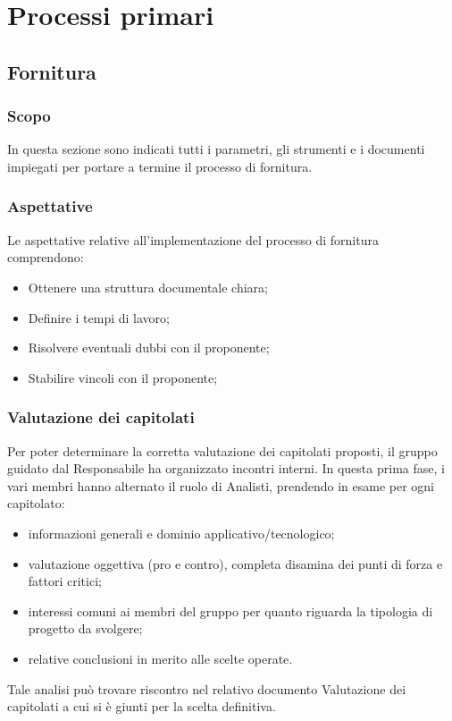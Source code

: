 \documentclass{article}
\begin{document}
\section{Processi primari}

\subsection{Fornitura}

\subsubsection{Scopo}
In questa sezione sono indicati tutti i parametri, gli strumenti e i documenti impiegati per portare a termine il processo di fornitura.

\subsubsection{Aspettative}
Le aspettative relative all'implementazione del processo di fornitura comprendono:
\begin{itemize}
    \item Ottenere una struttura documentale chiara;
    \item Definire i tempi di lavoro;
    \item Risolvere eventuali dubbi con il proponente;
    \item Stabilire vincoli con il proponente;
\end{itemize}

\subsubsection{Valutazione dei capitolati}
Per poter determinare la corretta valutazione dei capitolati proposti, il gruppo guidato dal Responsabile ha organizzato incontri interni. In questa prima fase, i vari membri hanno alternato il ruolo di Analisti, prendendo in esame per ogni capitolato:
\begin{itemize}
    \item informazioni generali e dominio applicativo/tecnologico;
    \item valutazione oggettiva (pro e contro), completa disamina dei punti di forza e fattori critici;
    \item interessi comuni ai membri del gruppo per quanto riguarda la tipologia di progetto da svolgere;
    \item relative conclusioni in merito alle scelte operate.
\end{itemize}
Tale analisi può trovare riscontro nel relativo documento Valutazione dei capitolati a cui si è giunti
per la scelta definitiva.
\end{document}
